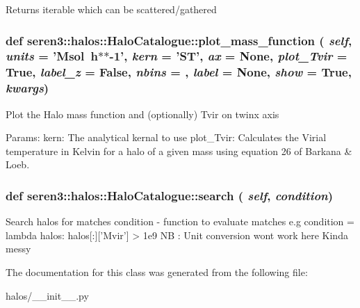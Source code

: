 \label{classseren3_1_1halos_1_1HaloCatalogue_a3b6e561ff1bb5ecaaccbba490948cf07}
\begin{DoxyVerb}
Returns iterable which can be scattered/gathered
\end{DoxyVerb}
 \hypertarget{classseren3_1_1halos_1_1HaloCatalogue_a97b20c3792552695581264729c24f15d}{
\subsubsection[{plot\_\-mass\_\-function}]{\setlength{\rightskip}{0pt plus 5cm}def seren3::halos::HaloCatalogue::plot\_\-mass\_\-function ( {\em self}, \/   {\em units} = {\ttfamily 'Msol~h$\ast$$\ast$-\/1'}, \/   {\em kern} = {\ttfamily 'ST'}, \/   {\em ax} = {\ttfamily None}, \/   {\em plot\_\-Tvir} = {\ttfamily True}, \/   {\em label\_\-z} = {\ttfamily False}, \/   {\em nbins} = {}, \/   {\em label} = {\ttfamily None}, \/   {\em show} = {\ttfamily True}, \/   {\em kwargs})}}
\label{classseren3_1_1halos_1_1HaloCatalogue_a97b20c3792552695581264729c24f15d}
\begin{DoxyVerb}
Plot the Halo mass function and (optionally) Tvir on twinx axis

Params:
    kern: The analytical kernal to use
    plot_Tvir: Calculates the Virial temperature in Kelvin for a halo of a given mass using equation 26 of Barkana & Loeb.
\end{DoxyVerb}
 \hypertarget{classseren3_1_1halos_1_1HaloCatalogue_a0959c4a81283bd463bf4e6fb1847f40e}{
\subsubsection[{search}]{\setlength{\rightskip}{0pt plus 5cm}def seren3::halos::HaloCatalogue::search ( {\em self}, \/   {\em condition})}}
\label{classseren3_1_1halos_1_1HaloCatalogue_a0959c4a81283bd463bf4e6fb1847f40e}
\begin{DoxyVerb}
Search halos for matches
condition - function to evaluate matches
e.g condition = lambda halos: halos[:]['Mvir'] > 1e9 NB : Unit conversion wont work here
Kinda messy
\end{DoxyVerb}
 

The documentation for this class was generated from the following file:\begin{DoxyCompactItemize}
\item 
halos/\_\-\_\-init\_\-\_\-.py\end{DoxyCompactItemize}
